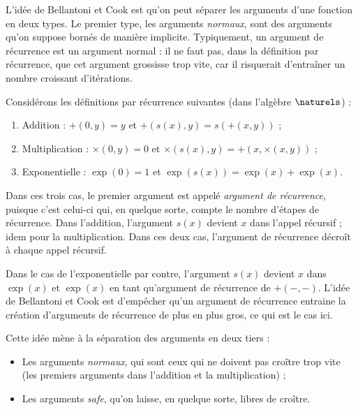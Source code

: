 \documentclass{report}
\begin{document}
			L'idée de Bellantoni et Cook \cite{BellantoniCook1992} est qu'on peut séparer les arguments d'une fonction en deux types. Le premier type, les arguments \emph{normaux}, sont des arguments qu'on suppose bornés de manière implicite. Typiquement, un argument de récurrence est un argument normal : il ne faut pas, dans la définition par récurrence, que cet argument grossisse trop vite, car il risquerait d'entraîner un nombre croissant d'itérations. 
			
			\begin{example}
				
				Considérons les définitions par récurrence suivantes (dans l'algèbre $\naturels$) :
				
				\begin{enumerate}
					\item	\label{itm:addition}
							Addition : $+(0 , y) = y$ et $+(s(x), y) = s\left( +(x, y)\right)$ ; 
							
					\item	\label{itm:multiplication}
							Multiplication : $\times \left( 0, y \right) = 0$ et $\times \left( s(x), y \right) = +\left( x, \times\left( x, y \right) \right)$ ; 
							
					\item	\label{itm:exponentielle}
							Exponentielle : $\exp(0) = 1$ et $\exp(s(x)) = \exp(x) + \exp(x)$.
				\end{enumerate}
				
				Dans ces trois cas, le premier argument est appelé \emph{argument de récurrence}, puisque c'est celui-ci qui, en quelque sorte, compte le nombre d'étapes de récurrence. Dans l'addition, l'argument $s(x)$ devient $x$ dans l'appel récursif ; idem pour la multiplication. Dans ces deux cas, l'argument de récurrence décroît à chaque appel récursif. 
				
				Dans le cas de l'exponentielle par contre, l'argument $s(x)$ devient $x$ dans $\exp(x)$ et $\exp(x)$ en tant qu'argument de récurrence de $+(-,-)$. L'idée de Bellantoni et Cook est d'empêcher qu'un argument de récurrence entraine la création d'arguments de récurrence de plus en plus gros, ce qui est le cas ici.
				
			\end{example}
			
			Cette idée mène à la séparation des arguments en deux tiers : 
			
			\begin{itemize}
				\item 	Les arguments \emph{normaux}, qui sont ceux qui ne doivent pas croître trop vite (les premiers arguments dans l'addition et la multiplication) ;
				\item 	Les arguments \emph{safe}, qu'on laisse, en quelque sorte, libres de croître. 
			\end{itemize}
			
\end{document}
